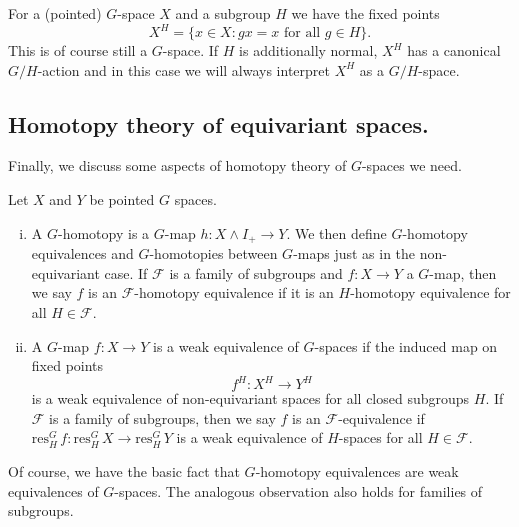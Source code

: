 For a (pointed) $G$-space $X$ and a subgroup $H$ we have
the fixed points 
\[
X^H = \{x\in X:gx = x \text{ for all } g\in H\}.
\]
This is of course still a $G$-space. If $H$ is additionally normal,
$X^H$ has a canonical $G/H$-action and in this case we
will always interpret $X^H$ as a $G/H$-space.


\subsection{Homotopy theory of equivariant spaces.}
Finally, we discuss some aspects of homotopy theory of $G$-spaces we need.
\begin{mydef} Let $X$ and $Y$ be pointed $G$ spaces.
\begin{enumerate}[(i)]
\item A $G$-homotopy is a $G$-map $h:X\wedge I_+\to Y$. We then define
$G$-homotopy equivalences and $G$-homotopies between $G$-maps
just as in the non-equivariant case.
If $\mathcal{F}$ is a family of subgroups and $f:X\to Y$ a $G$-map, 
then we say $f$ is an $\mathcal{F}$-homotopy equivalence
if it is an $H$-homotopy equivalence for all $H\in \mathcal{F}$.
\item A $G$-map $f:X\to Y$ is a weak equivalence of $G$-spaces if the induced map on
fixed points
\[f^H:X^H\to Y^H\]
is a weak equivalence of non-equivariant spaces for all closed subgroups $H$.
If $\mathcal{F}$ is a family of subgroups, 
then we say $f$ is an $\mathcal{F}$-equivalence
if $\mathrm{res}^G_H\, f: \mathrm{res}^G_H\, X\to \mathrm{res}^G_H\, Y$ 
is a weak equivalence of $H$-spaces for all $H\in \mathcal{F}$.
\end{enumerate}
\end{mydef}
Of course, we have the basic fact that $G$-homotopy equivalences are weak
equivalences of $G$-spaces. The analogous observation also holds
for families of subgroups.

